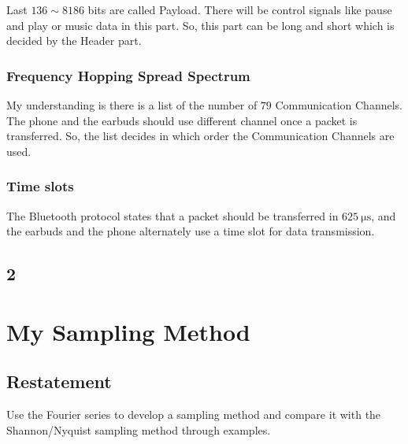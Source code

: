\documentclass{article}
\begin{document}
Last $136 \sim 8186$ bits are called {Payload}. There will be control signals like pause and play or music data in this part. So, this part can be long and short which is decided by the {Header} part.

\subsubsection*{Frequency Hopping Spread Spectrum}
My understanding is there is a list of the number of $79$ Communication Channels. The phone and the earbuds should use different channel once a packet is transferred. So, the list decides in which order the Communication Channels are used.

\subsubsection*{Time slots}
The Bluetooth protocol states that a packet should be transferred in $625~ \mathrm{\mu s}$, and the earbuds and the phone alternately use a time slot for data transmission.


\subsection{2}

\section{My Sampling Method}

\subsection{Restatement}
Use the Fourier series to develop a sampling method and compare it with the Shannon/Nyquist sampling method through
examples.
\end{document}
